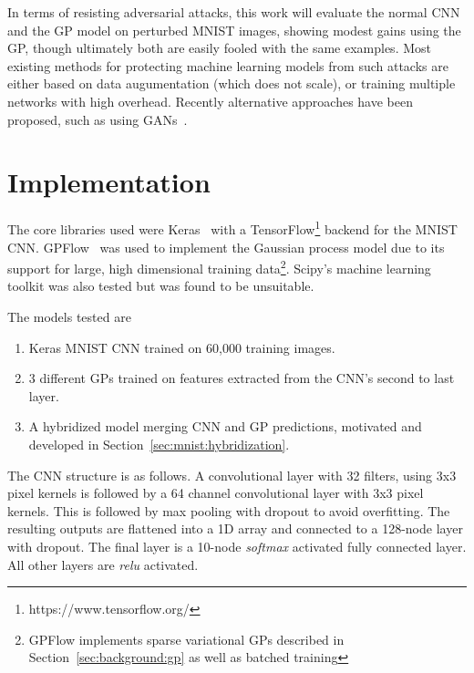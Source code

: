 \documentclass{article}
\begin{document}
In terms of resisting adversarial attacks, this work will evaluate the normal CNN and the GP model on perturbed MNIST images, showing modest gains using the GP, though ultimately both are easily fooled with the same examples. Most existing methods for protecting machine learning models from such attacks are either based on data augumentation (which does not scale), or training multiple networks with high overhead. Recently alternative approaches have been proposed, such as using GANs~\cite{samangouei2018defense}\cite{zantedeschi2017efficient}.


 
\section{Implementation}


The core libraries used were Keras~\cite{chollet2015keras} with a TensorFlow\footnote{https://www.tensorflow.org/} backend for the MNIST CNN. GPFlow~\cite{GPflow2017} was used to implement the Gaussian process model due to its support for large, high dimensional training data\footnote{GPFlow implements sparse variational GPs described in Section~\ref{sec:background:gp} as well as batched training}. Scipy's machine learning toolkit was also tested but was found to be unsuitable.

The models tested are
\begin{enumerate}
\item Keras MNIST CNN trained on 60,000 training images.
\item 3 different GPs trained on features extracted from the CNN's second to last layer.
\item A hybridized model merging CNN and GP predictions, motivated and developed in Section~\ref{sec:mnist:hybridization}.
\end{enumerate} 

The CNN structure is as follows. A convolutional layer with 32 filters, using 3x3 pixel kernels is followed by a 64 channel convolutional layer with 3x3 pixel kernels. This is followed by max pooling with dropout to avoid overfitting. The resulting outputs are flattened into a 1D array and connected to a 128-node layer with dropout. The final layer is a 10-node \textit{softmax} activated fully connected layer. All other layers are \textit{relu} activated.
\end{document}
